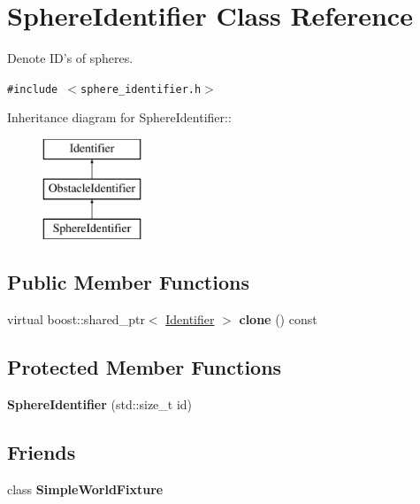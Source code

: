 \hypertarget{class_sphere_identifier}{
\section{SphereIdentifier Class Reference}
\label{class_sphere_identifier}
}
Denote ID's of spheres.  


{\tt \#include $<$sphere\_\-identifier.h$>$}

Inheritance diagram for SphereIdentifier::\begin{figure}[H]
\begin{center}
\leavevmode
\includegraphics[height=3cm]{class_sphere_identifier}
\end{center}
\end{figure}
\subsection*{Public Member Functions}
\begin{CompactItemize}
\item 
\hypertarget{class_sphere_identifier_e3e16fb0a8e0dfd15ab6c46f7b5661ed}{
virtual boost::shared\_\-ptr$<$ \hyperlink{class_identifier}{Identifier} $>$ \textbf{clone} () const }
\label{class_sphere_identifier_e3e16fb0a8e0dfd15ab6c46f7b5661ed}

\end{CompactItemize}
\subsection*{Protected Member Functions}
\begin{CompactItemize}
\item 
\hypertarget{class_sphere_identifier_d8aa95d39370ed459d385ce79cbb7c5a}{
\textbf{SphereIdentifier} (std::size\_\-t id)}
\label{class_sphere_identifier_d8aa95d39370ed459d385ce79cbb7c5a}

\end{CompactItemize}
\subsection*{Friends}
\begin{CompactItemize}
\item 
\hypertarget{class_sphere_identifier_6433c824d5e64fc5b3635b2a0f2af16c}{
class \textbf{SimpleWorldFixture}}
\label{class_sphere_identifier_6433c824d5e64fc5b3635b2a0f2af16c}

\end{CompactItemize}



